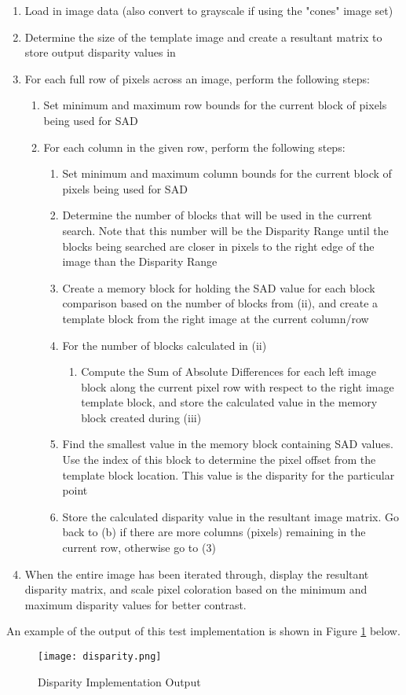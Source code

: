 \begin{enumerate}
\item
Load in image data (also convert to grayscale if using the "cones" image set)
\item
Determine the size of the template image and create a resultant matrix to store output disparity values in
\item
For each full row of pixels across an image, perform the following steps:
\begin{enumerate}
\item
Set minimum and maximum row bounds for the current block of pixels being used for SAD 
\item
For each column in the given row, perform the following steps:
\begin{enumerate}
\item
Set minimum and maximum column bounds for the current block of pixels being used for SAD
\item
Determine the number of blocks that will be used in the current search. Note that this number will be the Disparity Range until the blocks being searched are closer in pixels to the right edge of the image than the Disparity Range
\item
Create a memory block for holding the SAD value for each block comparison based on the number of blocks from (ii), and create a template block from the right image at the current column/row
\item
For the number of blocks calculated in (ii)
\begin{enumerate}
\item
Compute the Sum of Absolute Differences for each left image block along the current pixel row with respect to the right image template block, and store the calculated value in the memory block created during (iii)
\end{enumerate}
\item
Find the smallest value in the memory block containing SAD values. Use the index of this block to determine the pixel offset from the template block location. This value is the disparity for the particular point
\item
Store the calculated disparity value in the resultant image matrix. Go back to (b) if there are more columns (pixels) remaining in the current row, otherwise go to (3)
\end{enumerate}
\end{enumerate}
\item
When the entire image has been iterated through, display the resultant disparity matrix, and scale pixel coloration based on the minimum and maximum disparity values for better contrast.
\end{enumerate}
\doublespacing
\par
An example of the output of this test implementation is shown in Figure \ref{dispMatlabOutput} below.
\begin{figure}[H]
	\centerline{\texttt{[image: disparity.png]}}
	\caption{Disparity Implementation Output}
	\label{dispMatlabOutput}
\end{figure}

